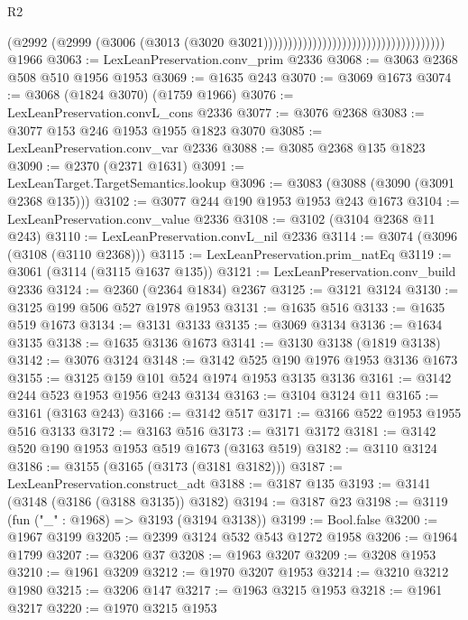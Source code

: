 \begin{lexlean}{R2}
\begin{coremodule}
                                                                    (@2992
                                                                      (@2999
                                                                        (@3006
                                                                          (@3013
                                                                            (@3020
                                                                              @3021)))))))))))))))))))))))))))))))))))))
    @1966
@3063 := LexLeanPreservation.conv_prim @2336
@3068 := @3063 @2368 @508 @510 @1956 @1953
@3069 := @1635 @243
@3070 := @3069 @1673
@3074 := @3068 (@1824 @3070) (@1759 @1966)
@3076 := LexLeanPreservation.convL_cons @2336
@3077 := @3076 @2368
@3083 := @3077 @153 @246 @1953 @1955 @1823 @3070
@3085 := LexLeanPreservation.conv_var @2336
@3088 := @3085 @2368 @135 @1823
@3090 := @2370 (@2371 @1631)
@3091 := LexLeanTarget.TargetSemantics.lookup
@3096 := @3083 (@3088 (@3090 (@3091 @2368 @135)))
@3102 := @3077 @244 @190 @1953 @1953 @243 @1673
@3104 := LexLeanPreservation.conv_value @2336
@3108 := @3102 (@3104 @2368 @11 @243)
@3110 := LexLeanPreservation.convL_nil @2336
@3114 := @3074 (@3096 (@3108 (@3110 @2368)))
@3115 := LexLeanPreservation.prim_natEq
@3119 := @3061 (@3114 (@3115 @1637 @135))
@3121 := LexLeanPreservation.conv_build @2336
@3124 := @2360 (@2364 @1834) @2367
@3125 := @3121 @3124
@3130 := @3125 @199 @506 @527 @1978 @1953
@3131 := @1635 @516
@3133 := @1635 @519 @1673
@3134 := @3131 @3133
@3135 := @3069 @3134
@3136 := @1634 @3135
@3138 := @1635 @3136 @1673
@3141 := @3130 @3138 (@1819 @3138)
@3142 := @3076 @3124
@3148 := @3142 @525 @190 @1976 @1953 @3136 @1673
@3155 := @3125 @159 @101 @524 @1974 @1953 @3135 @3136
@3161 := @3142 @244 @523 @1953 @1956 @243 @3134
@3163 := @3104 @3124 @11
@3165 := @3161 (@3163 @243)
@3166 := @3142 @517
@3171 := @3166 @522 @1953 @1955 @516 @3133
@3172 := @3163 @516
@3173 := @3171 @3172
@3181 := @3142 @520 @190 @1953 @1953 @519 @1673 (@3163 @519)
@3182 := @3110 @3124
@3186 := @3155 (@3165 (@3173 (@3181 @3182)))
@3187 := LexLeanPreservation.construct_adt
@3188 := @3187 @135
@3193 := @3141 (@3148 (@3186 (@3188 @3135)) @3182)
@3194 := @3187 @23
@3198 := @3119 (fun ("_" : @1968) => @3193 (@3194 @3138))
@3199 := Bool.false
@3200 := @1967 @3199
@3205 := @2399 @3124 @532 @543 @1272 @1958
@3206 := @1964 @1799
@3207 := @3206 @37
@3208 := @1963 @3207
@3209 := @3208 @1953
@3210 := @1961 @3209
@3212 := @1970 @3207 @1953
@3214 := @3210 @3212 @1980
@3215 := @3206 @147
@3217 := @1963 @3215 @1953
@3218 := @1961 @3217
@3220 := @1970 @3215 @1953

\end{coremodule}
\end{lexlean}
